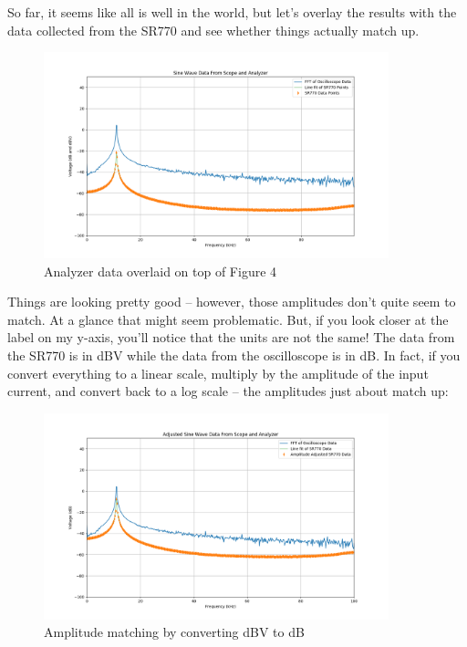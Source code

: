 \documentclass{article}
\begin{document}
So far, it seems like all is well in the world, but let's overlay the results
with the data collected from the SR770 and see whether things actually match
up.

\begin{figure}[H]
    \centering
\begin{minipage}{11cm}
\begin{tcolorbox}
        \includegraphics[width=10cm, height=6.cm]{figures/figure5.png}
        \caption{Analyzer data overlaid on top of Figure 4}
        \label{fig:fig5}
\end{tcolorbox}
\end{minipage}
\end{figure}

Things are looking pretty good -- however, those amplitudes don't quite seem to
match. At a glance that might seem problematic. But, if you look closer at the
label on my y-axis, you'll notice that the units are not the same! The data
from the SR770 is in dBV while the data from the oscilloscope is in dB. In
fact, if you convert everything to a linear scale, multiply by the amplitude of
the input current, and convert back to a log scale -- the amplitudes just about
match up:

\begin{figure}[H]
    \centering
\begin{minipage}{11cm}
\begin{tcolorbox}
        \includegraphics[width=10cm, height=6.cm]{figures/figure6.png}
        \caption{Amplitude matching by converting dBV to dB}
        \label{fig:fig6}
\end{tcolorbox}
\end{minipage}
\end{figure}
\end{document}
